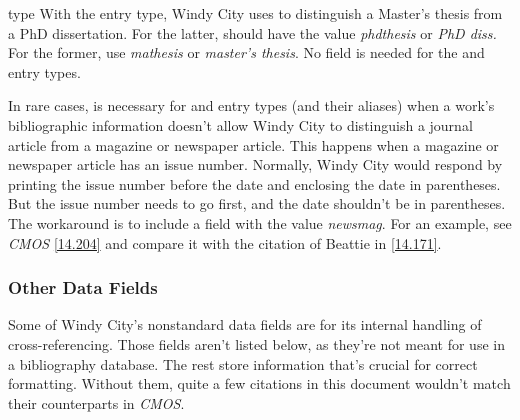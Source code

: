 \documentclass[11pt,letterpaper,oneside]{article}
\begin{document}
\begin{marglist}
\item[type] With the  entry type, Windy City uses
 to distinguish a Master's thesis from a PhD
dissertation. For the latter,  should have the value
\textit{phdthesis} or \textit{PhD diss.} For the former, use
\textit{mathesis} or \textit{master's thesis}. No 
field is needed for the  and 
entry types.

In rare cases,  is necessary for  and
 entry types (and their aliases) when a work's
bibliographic information doesn't allow Windy City to distinguish a
journal article from a magazine or newspaper article. This happens
when a magazine or newspaper article has an issue number. Normally,
Windy City would respond by printing the issue number before the date
and enclosing the date in parentheses. But the issue number needs to
go first, and the date shouldn't be in parentheses. The workaround is
to include a  field with the value \textit{newsmag}.
For an example, see \textit{CMOS} \ref{14.204} and compare it with the
citation of Beattie in \ref{14.171}.

\end{marglist}

\subsubsection{Other Data Fields}
\label{otherfields}

Some of Windy City's nonstandard data fields are for its internal
handling of cross-referencing. Those fields aren't listed below, as
they're not meant for use in a bibliography database. The rest store
information that's crucial for correct formatting. Without them, quite
a few citations in this document wouldn't match their counterparts in
\textit{CMOS}.
\end{document}
